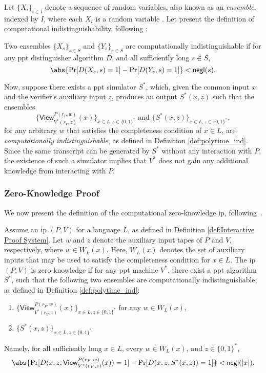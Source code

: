 Let $\{X_i\}_{i \in I}$ denote a sequence of random variables, also known as an \textit{ensemble}, indexed by $I$, where each $X_i$ is a random variable \cite{Goldreich2001Book}.  Let present the definition of computational indistinguishability, following \cite[Definition 3.2.2]{Goldreich2001Book}:
\begin{definition}\label{def:polytime_ind}	
	Two ensembles $\{X_s\}_{s\in S}$ and $\{Y_s\}_{s\in S}$ are  computationally indistinguishable if for any \gls{ppt} distinguisher algorithm $D$, and all sufficiently long $s \in S$,
	\[
	\abs{\Pr[D(X_s, s) = 1] - \Pr[D(Y_s, s) = 1]} < \mathsf{negl}(s).
	\]
\end{definition}



Now, suppose there exists a \gls{ppt} simulator $S^*$, which, given the common input $x$ and the verifier's auxiliary input $z$, produces an output $S^*(x, z)$ such that the ensembles  
\[
\{\textsf{View}_{V^*(r_V, z)}^{P(r_P, w)}(x)\}_{x\in L, z \in \{0,1\}^*} \text{ and } \{S^*(x, z)\}_{x\in L, z \in \{0,1\}^*},
\]  
for any arbitrary $w$ that satisfies the completeness condition of $x\in L$, are \textit{computationally indistinguishable}, as defined in Definition \ref{def:polytime_ind}. Since the same transcript can be generated by $S^*$ without any interaction with $P$, the existence of such a simulator implies that $V^*$ does not gain any additional knowledge from interacting with $P$.


\subsubsection{Zero-Knowledge Proof}\label{sec:prel_zero_knowledge_property}
We now present the definition of the computational zero-knowledge \gls{ip}, following~\cite[Definition 4.3.10]{Goldreich2001Book}.

\begin{definition}\label{def:zk-proerty}	Assume an \gls{ip} $(P, V)$ for a language $L$, as defined in Definition \ref{def:Interactive Proof System}. Let $w$ and $z$ denote the auxiliary input tapes of $P$ and $V$, respectively, where $w \in W_L(x)$. Here, $W_L(x)$ denotes the set of auxiliary inputs that may be used to satisfy the completeness condition for $x \in L$.  The \gls{ip} $(P, V)$  is zero-knowledge if for any \gls{ppt} machine $V^*$, there exist a  \gls{ppt} algorithm $S^*$, such that the following  two ensembles are computationally indistinguishable, as defined in Definition \ref{def:polytime_ind}:
\begin{enumerate}
	\item $\{\textsf{View}_{V^*(r_V, z)}^{P(r_P, w)}(x)\}_{x\in L, z \in \{0,1\}^*} \text{ for any } w \in  W_L(x)$,
	\item $\{S^*(x, z)\}_{x\in L, z \in \{0,1\}^*}$.
\end{enumerate}
Namely, for all sufficiently long $x \in L$, every $w \in  W_L(x)$, and $z \in \{0,1\}^*$,
\[
	\abs{\Pr[D(x, z, \textsf{View}_{V^*(r_V, z)}^{P(r_P, w)}(x)) = 1] - \Pr[D(x, z, S^*(x, z)) = 1]} < \mathsf{negl}(|x|).
\]
\end{definition}

